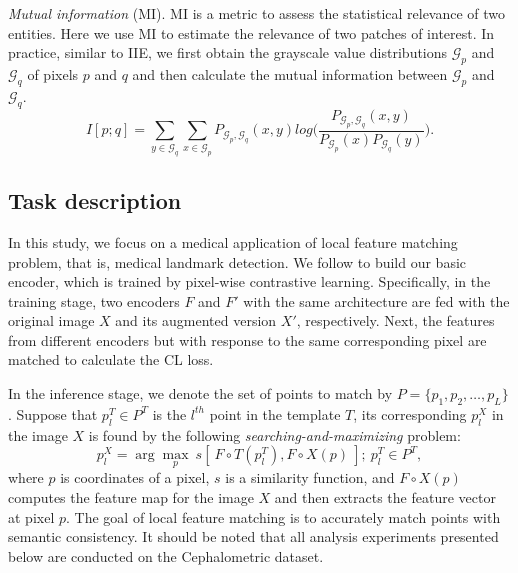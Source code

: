 \documentclass[10pt,twocolumn,letterpaper]{article}
\begin{document}
{\it Mutual information} (MI). MI is a metric to assess the statistical relevance of two entities. Here we use MI to estimate the relevance of two patches of interest. In practice, similar to IIE, we first obtain the grayscale value distributions $\mathcal{G}_p$ and $\mathcal{G}_q$ of pixels $p$ and $q$ and then calculate the mutual information between $\mathcal{G}_p$ and $\mathcal{G}_q$.
\begin{equation}
    I[p;q] = \sum_{y \in \mathcal{G}_q} \sum_{x \in \mathcal{G}_p} P_{\mathcal{G}_p,\mathcal{G}_q} (x,y) log \Big(\frac{P_{\mathcal{G}_p,\mathcal{G}_q} (x,y)}{P_\mathcal{G}_p (x) P_\mathcal{G}_q (y)} \Big).
\end{equation}

\subsection{Task description}
In this study, we focus on a medical application of local feature matching problem, that is, medical landmark detection. We follow \cite{quan2021images} to build our basic encoder, which is trained by pixel-wise contrastive learning. Specifically, in the training stage, two encoders $F$ and $F'$ with the same architecture are fed with the original image $X$ and its augmented version $X'$, respectively. Next, the features from different encoders but with response to the same corresponding pixel are matched to calculate the CL loss.

In the inference stage, we denote the set of points to match by $P=\{p_1,p_2,\dots,p_L\}$. Suppose that $p_l^T \in P^T$ is the $l^{th}$ point in the template $T$, its corresponding $p_l^X$ in the image $X$ is found by the following \textit{searching-and-maximizing} problem:
\begin{equation}
p_l^X = \arg\max_{p} ~ s[~F \circ T(p_l^T), F \circ X(p)~]; ~p_l^T \in P^T,
\label{eq:s}
\end{equation}
where $p$ is coordinates of a pixel, $s$ is a similarity function, and $F\circ X(p)$ computes the feature map for the image $X$ and then extracts the feature vector at pixel $p$. The goal of local feature matching is to accurately match points with semantic consistency. It should be noted that all analysis experiments presented below are conducted on the Cephalometric dataset.

\end{document}
